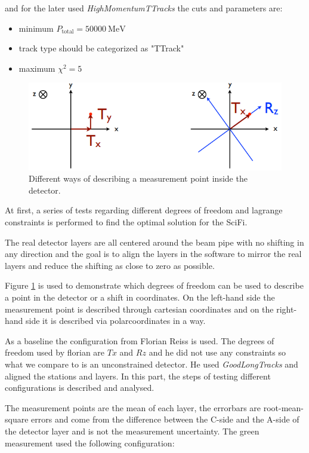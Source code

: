 and for the later used \textit{HighMomentumTTracks} the cuts and parameters are:

\begin{itemize}
  \item minimum $P_{\text{total}} = \SI{50000}{\mega\electronvolt}$
  \item track type should be categorized as "TTrack"
  \item maximum $\chi^2 = 5$
\end{itemize}

\begin{figure}
  \centering
  \includegraphics{plots/point_dofs.png}
  \caption{Different ways of describing a measurement point inside the detector.}
  \label{fig:dofs}
\end{figure}

At first, a series of tests regarding different degrees of freedom and lagrange constraints is performed to find the optimal solution for the SciFi.

The real detector layers are all centered around the beam pipe with no shifting
in any direction and the goal is to align the layers in the software to mirror
the real layers and reduce the shifting as close to zero as possible.

Figure \ref{fig:dofs} is used to demonstrate which degrees of freedom can be used
to describe a point in the detector or a shift in coordinates.
On the left-hand side the measurement point is described through cartesian coordinates and on the right-hand side it is described via polarcoordinates in a way.

As a baseline the configuration from Florian Reiss is used.
The degrees of freedom used by florian are $Tx$ and $Rz$ and he did not use any constraints so what we compare to is an unconstrained detector. He used \textit{GoodLongTracks} and aligned the stations and layers.
In this part, the steps of testing different configurations is described and analysed.

The measurement points are the mean of each layer, the errorbars are root-mean-square errors and come from the difference between the C-side and the A-side of the detector layer and is not the measurement uncertainty.
The green measurement used the following configuration:

